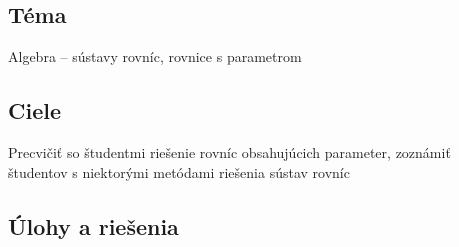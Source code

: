 
\subsection*{Téma}
Algebra -- sústavy rovníc, rovnice s parametrom

\subsection*{Ciele}

Precvičiť so študentmi riešenie rovníc obsahujúcich parameter, zoznámiť študentov s niektorými metódami riešenia sústav rovníc

\subsection*{Úlohy a riešenia} 












%

%